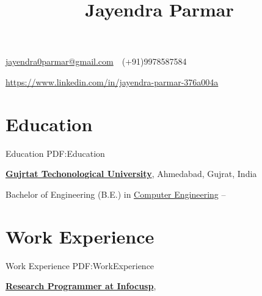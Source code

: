 \documentclass[letterpaper,MMMyyyy,nonstop]{simpleresumecv}
\newcommand{\CVAuthor}{Jayendra Parmar}
\begin{document}

\title{\CVAuthor}

\begin{subtitle}
\par
\href{mailto:jayendra0parmar@gmail.com}
{jayendra0parmar@gmail.com}
\,\SubBulletSymbol\,
(+91)9978587584
\,\SubBulletSymbol\,
\href{\CVWebpage}
{\CVWebpage}

\end{subtitle}

\begin{body}

    \href{https://www.linkedin.com/in/jayendra-parmar-376a004a}
    {https://www.linkedin.com/in/jayendra-parmar-376a004a}
  

\section
{Education}
{Education}
{PDF:Education}

\href{http://www.example.com/my-university}
{\textbf{Gujrtat Techonological University}},
Ahmedabad, Gujrat, India

\GapNoBreak
\BulletItem
Bachelor of Engineering (B.E.) in
\href{http://www.example.com/my-department}
{Computer Engineering}
\hfill
{} --


\section
{Work Experience}
{Work Experience}
{PDF:WorkExperience}


\href{http://www.infocusp.in}
{\textbf{Research Programmer at Infocusp}},


\end{body}
\end{document}

